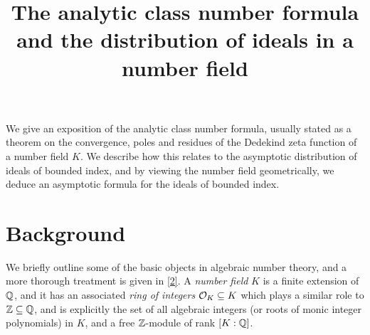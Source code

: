 \documentclass[11pt]{report}
\title{The analytic class number formula and the distribution of ideals in a number field}
\begin{document}
\maketitle
\abstract

We give an exposition of the analytic class number formula, usually stated as a theorem on the convergence, poles and residues of the Dedekind zeta function of a number field $K$. We describe how this relates to the asymptotic distribution of ideals of bounded index, and by viewing the number field geometrically, we deduce an asymptotic formula for the ideals of bounded index. 

\tableofcontents
\chapter{Background} %
We briefly outline some of the basic objects in algebraic number theory, and a more thorough treatment is given in \hyperlink{stevenhagen}{[2]}. A \emph{number field} $K$ is a finite extension of $\mathbb{Q}$, and it has an associated \emph{ring of integers} $\mathcal{O}_K \subseteq K$ which plays a similar role to $\mathbb{Z} \subseteq \mathbb{Q}$, and is explicitly the set of all algebraic integers (or roots of monic integer polynomials) in $K$, and a free $\mathbb{Z}$-module of rank $[K : \mathbb{Q}]$.
\end{document}
